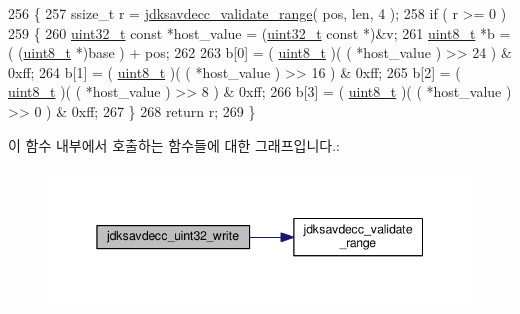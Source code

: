 \begin{DoxyCode}
256 \{
257     ssize\_t r = \hyperlink{group__util_ga9c02bdfe76c69163647c3196db7a73a1}{jdksavdecc\_validate\_range}( pos, len, 4 );
258     \textcolor{keywordflow}{if} ( r >= 0 )
259     \{
260         \hyperlink{parse_8c_a6eb1e68cc391dd753bc8ce896dbb8315}{uint32\_t} \textcolor{keyword}{const} *host\_value = (\hyperlink{parse_8c_a6eb1e68cc391dd753bc8ce896dbb8315}{uint32\_t} \textcolor{keyword}{const} *)&v;
261         \hyperlink{stdint_8h_aba7bc1797add20fe3efdf37ced1182c5}{uint8\_t} *b = ( (\hyperlink{stdint_8h_aba7bc1797add20fe3efdf37ced1182c5}{uint8\_t} *)base ) + pos;
262 
263         b[0] = ( \hyperlink{stdint_8h_aba7bc1797add20fe3efdf37ced1182c5}{uint8\_t} )( ( *host\_value ) >> 24 ) & 0xff;
264         b[1] = ( \hyperlink{stdint_8h_aba7bc1797add20fe3efdf37ced1182c5}{uint8\_t} )( ( *host\_value ) >> 16 ) & 0xff;
265         b[2] = ( \hyperlink{stdint_8h_aba7bc1797add20fe3efdf37ced1182c5}{uint8\_t} )( ( *host\_value ) >> 8 ) & 0xff;
266         b[3] = ( \hyperlink{stdint_8h_aba7bc1797add20fe3efdf37ced1182c5}{uint8\_t} )( ( *host\_value ) >> 0 ) & 0xff;
267     \}
268     \textcolor{keywordflow}{return} r;
269 \}
\end{DoxyCode}


이 함수 내부에서 호출하는 함수들에 대한 그래프입니다.\+:
\nopagebreak
\begin{figure}[H]
\begin{center}
\leavevmode
\includegraphics[width=345pt]{group__endian_ga5c8d1aadb6e4ea355503a1945cfdbb92_cgraph}
\end{center}
\end{figure}





